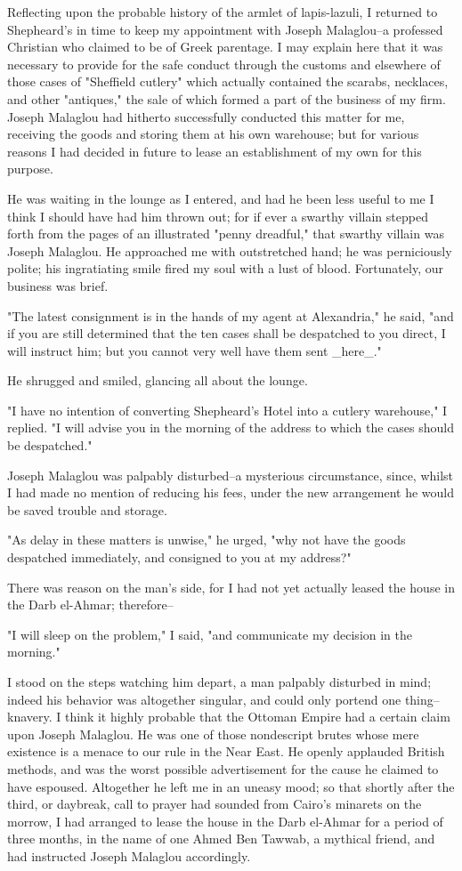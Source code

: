 Reflecting upon the probable history of the armlet of lapis-lazuli,
I returned to Shepheard's in time to keep my appointment with Joseph
Malaglou--a professed Christian who claimed to be of Greek parentage.
I may explain here that it was necessary to provide for the safe
conduct through the customs and elsewhere of those cases of "Sheffield
cutlery" which actually contained the scarabs, necklaces, and other
"antiques," the sale of which formed a part of the business of my
firm. Joseph Malaglou had hitherto successfully conducted this matter
for me, receiving the goods and storing them at his own warehouse; but
for various reasons I had decided in future to lease an establishment
of my own for this purpose.

He was waiting in the lounge as I entered, and had he been less useful
to me I think I should have had him thrown out; for if ever a swarthy
villain stepped forth from the pages of an illustrated "penny
dreadful," that swarthy villain was Joseph Malaglou. He approached me
with outstretched hand; he was perniciously polite; his ingratiating
smile fired my soul with a lust of blood. Fortunately, our business
was brief.

"The latest consignment is in the hands of my agent at Alexandria,"
he said, "and if you are still determined that the ten cases shall
be despatched to you direct, I will instruct him; but you cannot
very well have them sent _here_."

He shrugged and smiled, glancing all about the lounge.

"I have no intention of converting Shepheard's Hotel into a cutlery
warehouse," I replied. "I will advise you in the morning of the
address to which the cases should be despatched."

Joseph Malaglou was palpably disturbed--a mysterious circumstance,
since, whilst I had made no mention of reducing his fees, under the
new arrangement he would be saved trouble and storage.

"As delay in these matters is unwise," he urged, "why not have the
goods despatched immediately, and consigned to you at my address?"

There was reason on the man's side, for I had not yet actually leased
the house in the Darb el-Ahmar; therefore--

"I will sleep on the problem," I said, "and communicate my decision in
the morning."

I stood on the steps watching him depart, a man palpably disturbed in
mind; indeed his behavior was altogether singular, and could only
portend one thing--knavery. I think it highly probable that the
Ottoman Empire had a certain claim upon Joseph Malaglou. He was one of
those nondescript brutes whose mere existence is a menace to our rule
in the Near East. He openly applauded British methods, and was the
worst possible advertisement for the cause he claimed to have
espoused. Altogether he left me in an uneasy mood; so that shortly
after the third, or daybreak, call to prayer had sounded from Cairo's
minarets on the morrow, I had arranged to lease the house in the Darb
el-Ahmar for a period of three months, in the name of one Ahmed Ben
Tawwab, a mythical friend, and had instructed Joseph Malaglou
accordingly.

